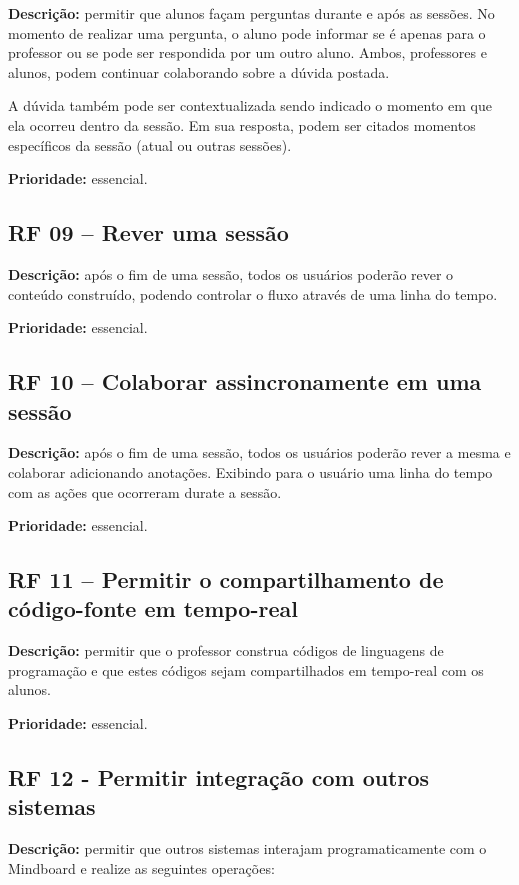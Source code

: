 \textbf{Descrição:} permitir que alunos façam perguntas durante e após as sessões. No momento de realizar uma pergunta, o aluno pode informar se é apenas para o professor ou se pode ser respondida por um outro aluno. Ambos, professores e alunos, podem continuar colaborando sobre a dúvida postada.

A dúvida também pode ser contextualizada sendo indicado o momento em que ela ocorreu dentro da sessão. Em sua resposta, podem ser citados momentos específicos da sessão (atual ou outras sessões).

\textbf{Prioridade:} essencial.


\subsection{RF 09 – Rever uma sessão}

\textbf{Descrição:} após o fim de uma sessão, todos os usuários poderão rever o conteúdo construído, podendo controlar o fluxo através de uma linha do tempo.

\textbf{Prioridade:} essencial.

\subsection{RF 10 – Colaborar assincronamente em uma sessão}

\textbf{Descrição:} após o fim de uma sessão, todos os usuários poderão rever a mesma e colaborar adicionando anotações. Exibindo para o usuário uma linha do tempo com as ações que ocorreram durate a sessão.

\textbf{Prioridade:} essencial.

\subsection{RF 11 – Permitir o compartilhamento de código-fonte em tempo-real}

\textbf{Descrição:} permitir que o professor construa códigos de linguagens de programação e que estes códigos sejam compartilhados em tempo-real com os alunos.

\textbf{Prioridade:} essencial.

\subsection{RF 12 - Permitir integração com outros sistemas}

\textbf{Descrição:} permitir que outros sistemas interajam programaticamente com o Mindboard e realize as seguintes operações:

